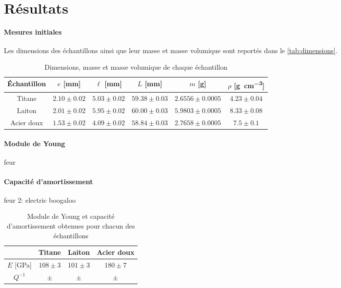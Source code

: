 \section{Résultats}

\paragraph{Mesures initiales} Les dimensions des échantillons ainsi que leur masse et masse volumique sont reportés dans le \autoref{tab:dimensions}.

\begin{table}
    \centering
    \begin{tabulary}{0.7\linewidth}{c|c c c c c}
        \toprule
        Échantillon & \(e\) [\si{\milli\meter}] & \(\ell\) [\si{\milli\meter}] & \(L\) [\si{\milli\meter}] & \(m\) [\si{\gram}] & \(\rho\) [\si{\gram\per\cubic\centi\meter}] \\
        \midrule
        Titane & \(2.10 \pm 0.02\) & \(5.03 \pm 0.02\) & \(59.38 \pm 0.03\) & \(2.6556 \pm 0.0005\) & \(4.23 \pm 0.04\) \\
        Laiton & \(2.01 \pm 0.02\) & \(5.95 \pm 0.02\) & \(60.00 \pm 0.03\) & \(5.9803 \pm 0.0005\) & \(8.33 \pm 0.08\) \\
        Acier doux & \(1.53 \pm 0.02\) & \(4.09 \pm 0.02\) & \(58.84 \pm 0.03\) & \(2.7658 \pm 0.0005\) & \(7.5 \pm 0.1\) \\
        \bottomrule
    \end{tabulary}
    \caption{Dimensions, masse et masse volumique de chaque échantillon}
    \label{tab:dimensions}
\end{table}

\paragraph{Module de Young} feur

\paragraph{Capacité d'amortissement} feur 2: electric boogaloo

\begin{table}
    \centering
    \begin{tabulary}{0.7\linewidth}{c|C C C}
        \toprule
        & Titane & Laiton & Acier doux \\
        \midrule
        \(E\) [\si{\giga\pascal}] & \(108 \pm 3\) & \(101 \pm 3\) & \(180 \pm 7\) \\
        \(Q^{-1}\) & \(\pm\) & \(\pm\) & \(\pm\) \\
        \bottomrule
    \end{tabulary}
    \caption{Module de Young et capacité d'amortissement obtenues pour chacun des échantillons}
    \label{tab:young_amortissement}
\end{table}